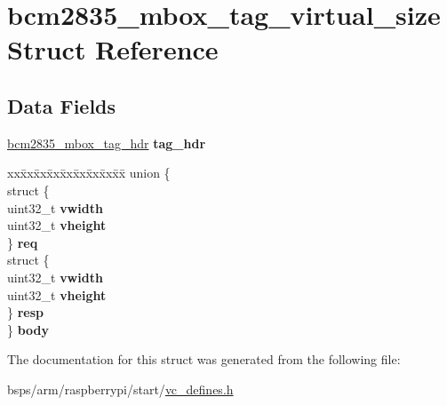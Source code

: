\hypertarget{structbcm2835__mbox__tag__virtual__size}{}\section{bcm2835\+\_\+mbox\+\_\+tag\+\_\+virtual\+\_\+size Struct Reference}
\label{structbcm2835__mbox__tag__virtual__size}
\subsection*{Data Fields}
\begin{DoxyCompactItemize}
\item 
\mbox{\label{structbcm2835__mbox__tag__virtual__size_a70abf200344c733e7552e7093a6196fb}} 
\mbox{\hyperlink{structbcm2835__mbox__tag__hdr}{bcm2835\+\_\+mbox\+\_\+tag\+\_\+hdr}} {\bfseries tag\+\_\+hdr}
\item 
\mbox{\label{structbcm2835__mbox__tag__virtual__size_af9e6e7f08eef923e2549da3f5e52b502}} 
\begin{tabbing}
xx\=xx\=xx\=xx\=xx\=xx\=xx\=xx\=xx\=\kill
union \{\\
\>struct \{\\
\>\>uint32\_t {\bfseries vwidth}\\
\>\>uint32\_t {\bfseries vheight}\\
\>\} {\bfseries req}\\
\>struct \{\\
\>\>uint32\_t {\bfseries vwidth}\\
\>\>uint32\_t {\bfseries vheight}\\
\>\} {\bfseries resp}\\
\} {\bfseries body}\\

\end{tabbing}\end{DoxyCompactItemize}


The documentation for this struct was generated from the following file\+:\begin{DoxyCompactItemize}
\item 
bsps/arm/raspberrypi/start/\mbox{\hyperlink{vc__defines_8h}{vc\+\_\+defines.\+h}}\end{DoxyCompactItemize}
